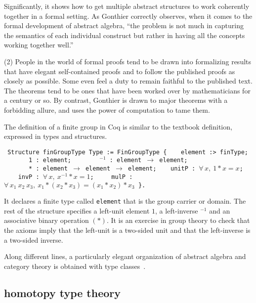 \documentclass{llncs}
\begin{document}


 Significantly, it shows how to get multiple abstract structures
to work coherently together in a formal setting.  As Gonthier
correctly observes, when it comes to the formal development of
abstract algebra, ``the problem is not much in capturing the semantics
of each individual construct but rather in having all the concepts
working together well.'' %

(2) People in the world of formal proofs tend to be drawn into
formalizing results that have elegant self-contained proofs and to
follow the published proofs as closely as possible.  Some even feel a
duty to remain faithful to the published text.  The theorems tend to
be ones that have been worked over by mathematicians for a century or
so.  By contrast, Gonthier is drawn to major theorems with a
forbidding allure, and uses the power of computation to tame them.

The definition of a finite group in Coq is similar to the textbook definition,
expressed in types and structures.
\bigskip
{

\obeylines\tt
Structure~finGroupType~Type~:= FinGroupType \{
~~~element~:>~finType;
~~~~~~~1~:~element;
~~~~~~\hskip0.8mm ${}^{-1}$~:~element $\to$ element;
~~~~~~~*~:~element $\to$ element $\to$ element;
~~~unitP~:~$\forall\,x,~1*x = x$;
~~~~invP~:~$\forall\,x,~x^{-1} * x = 1$;
~~~~mulP~:~$\forall\,x_1~x_2~x_3,~ x_1 * (x_2 * x_3) = (x_1 * x_2) * x_3$
\}.

}

\smallskip

It declares a finite type called {\tt element} that is the group
carrier or domain.  The rest of the structure specifies a left-unit
element $1$, a left-inverse ${}^{-1}$ and an associative binary
operation $( * )$.  It is an exercise in group theory to check that
the axioms imply that the left-unit is a two-sided unit and that the
left-inverse is a two-sided inverse.

Along different lines, a particularly elegant organization of abstract
algebra and category theory is obtained with type
classes~\cite{SpE11}.

\subsection{homotopy type theory}
\end{document}
